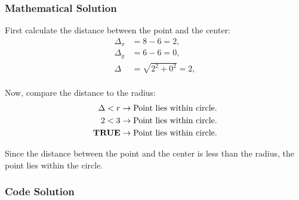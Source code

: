 \subsubsection{Mathematical Solution}

First calculate the distance between the point and the center:
\begin{equation*}
    \begin{aligned}
        \Delta_x & = 8 - 6 = 2,            \\
        \Delta_y & = 6 - 6 = 0,            \\
        \Delta   & = \sqrt{2^2 + 0^2} = 2, \\
    \end{aligned}
\end{equation*}

Now, compare the distance to the radius:
\begin{equation*}
    \begin{aligned}
        \Delta < r                 & \rightarrow \textnormal{Point lies within circle.} \\
        2 < 3                      & \rightarrow \textnormal{Point lies within circle.} \\
        \textnormal{\textbf{TRUE}} & \rightarrow \textnormal{Point lies within circle.} \\
    \end{aligned}
\end{equation*}

Since the distance between the point and the center is less than the radius,
the point lies within the circle.

\subsubsection{Code Solution}


